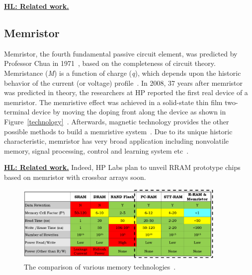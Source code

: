 \textbf{\underline{HL: Related work.}}

\subsection{Memristor}
Memristor, the fourth fundamental passive circuit element, was predicted by Professor Chua in 1971~\cite{Chua71}, based on the completeness of circuit theory. %
Memristance (\textit{M}) is a function of charge (\textit{q}),  which depends upon the historic behavior of the current (or voltage) profile~\cite{Chua76,Strukov08}. In 2008, 37 years after memristor was predicted in theory, the researchers at HP reported the first real device of a memristor. The memristive effect was achieved in a solid-state thin film two-terminal device by moving the doping front along the device as shown in Figure~\ref{technology}~\cite{Tour08}. Afterwards, magnetic technology provides the other possible methods to build a memristive system~\cite{Pershin08,Wang09}. Due to its unique historic characteristic, memristor has very broad application including nonvolatile memory, signal processing, control and learning system etc~\cite{Chen09}.

\textbf{\underline{HL: Related work.}} Indeed, HP Labs plan to unveil RRAM prototype chips based on memristor with crossbar arrays soon.

\begin{figure}
\centering
\vspace{-10pt}
\includegraphics[width=0.9\textwidth]{./figure/2_table.pdf} 
\vspace{-10pt}
\caption{The comparison of various memory technologies~\cite{ITRS07}.}
\label{table}
\vspace{-10pt}
\end{figure}

